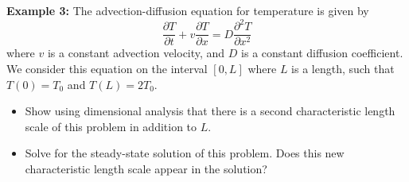 \\
\\
    {\bf Example 3:}
The advection-diffusion equation for temperature is given by  
\begin{equation} 
\frac{\partial T}{\partial t} + v \frac{\partial T}{\partial x} = D \frac{\partial^2 T}{\partial x^2}
\label{eq:adv_diff}
\end{equation}
where $v$ is a constant advection velocity, and $D$ is a constant diffusion coefficient. We consider this equation on the interval $[0,L]$ where $L$ is a length, such that $T(0) = T_0$ and $T(L) = 2T_0$. 
\begin{itemize}
    \item Show using dimensional analysis that there is a second characteristic length scale of this problem in addition to $L$.
    \item Solve for the steady-state solution of this problem. Does this new characteristic length scale appear in the solution?
\end{itemize}
\\
\\

